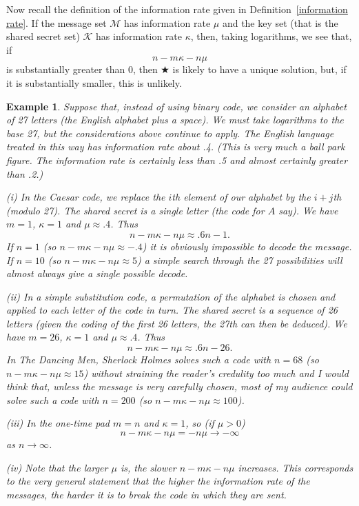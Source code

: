 \documentclass[12pt,a4paper]{article}
\theoremstyle{plain}
\newtheorem{example}[theorem]{Example}
\theoremstyle{definition}
\begin{document}
Now recall the definition of the information rate
given in Definition~\ref{information rate}.
If the message set ${\mathcal M}$
has information rate $\mu$
and the key set (that is the
shared secret set) $\mathcal{K}$
has information rate $\kappa$, then, taking logarithms,
we see that, if
\[n-m\kappa-n\mu\]
is substantially greater than $0$, then $\bigstar$
is likely to have a unique solution, but, if it is
substantially smaller, this is unlikely.
\begin{example} Suppose that,
instead of using binary
code, we consider an alphabet of 27 letters
(the English alphabet plus a space). We must
take logarithms to the base 27, but the considerations
above continue to apply. The English language
treated in this way has information rate
about .4. (This is very much a ball park figure.
The information rate is certainly less than .5
and almost certainly greater than .2.)

(i) In the Caesar code, we replace the $i$th element
of our alphabet by the $i+j$th (modulo 27). The
shared secret is a single letter (the code for $A$ say).
We have $m=1$, $\kappa=1$ and $\mu\approx .4$. Thus
\[n-m\kappa-n\mu\approx .6n-1.\]
If $n=1$ (so $n-m\kappa-n\mu\approx-.4$) it is obviously
impossible to decode the message. If $n=10$
(so $n-m\kappa-n\mu\approx 5$) a simple search through the
27 possibilities will almost always give a single
possible decode.

(ii) In a simple substitution code, a permutation of the
alphabet is chosen and applied to each letter of the
code in turn. The shared secret is a sequence of
26 letters (given the coding of the first 26 letters,
the 27th can then be deduced).
We have $m=26$, $\kappa=1$ and $\mu\approx .4$. Thus
\[n-m\kappa-n\mu\approx .6n-26.\]
In \emph{The Dancing Men}, Sherlock Holmes
solves such a code with $n=68$
(so $n-m\kappa-n\mu\approx 15$) without straining
the reader's credulity too much and I
would think that, unless the message is
very carefully chosen, most of my audience
could solve such a code with $n=200$
(so $n-m\kappa-n\mu\approx 100$).

(iii) In the one-time pad $m=n$ and $\kappa=1$,
so (if $\mu>0$)
\[n-m\kappa-n\mu=-n\mu\rightarrow-\infty\]
as $n\rightarrow\infty$.

(iv) Note that the larger $\mu$ is, the slower
$n-m\kappa-n\mu$ increases. This corresponds
to the very general statement that the
higher the information rate of the messages,
the harder it is to break the code in which they
are sent.
\end{example}
\end{document}
